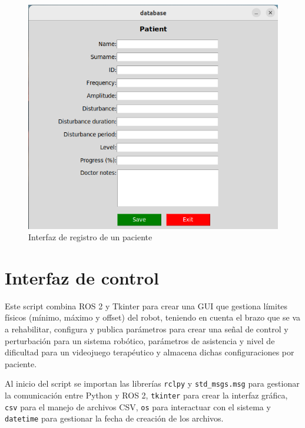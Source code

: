 \begin{figure}[ht!]
	\centering
	\begin{minipage}{0.75\linewidth}
		\centering
		\includegraphics[width=\linewidth]{figs/registro.png}
	\end{minipage}
	\caption[Interfaz de registro de un paciente]{Interfaz de registro de un paciente}
	\label{fig:database}
\end{figure}

\section{Interfaz de control}
\label{section:controller}

Este script combina ROS 2 y Tkinter para crear una GUI que gestiona límites físicos (mínimo, máximo y offset) del robot, teniendo en cuenta el brazo que se va a rehabilitar, configura y publica parámetros para crear una señal de control y perturbación para un sistema robótico, parámetros de asistencia y nivel de dificultad para un videojuego terapéutico y almacena dichas configuraciones por paciente.

Al inicio del script se importan las librerías \verb|rclpy| y \verb|std_msgs.msg| para gestionar la comunicación entre Python y ROS 2, \verb|tkinter| para crear la interfaz gráfica, \verb|csv| para el manejo de archivos CSV, \verb|os| para interactuar con el sistema y \verb|datetime| para gestionar la fecha de creación de los archivos.

